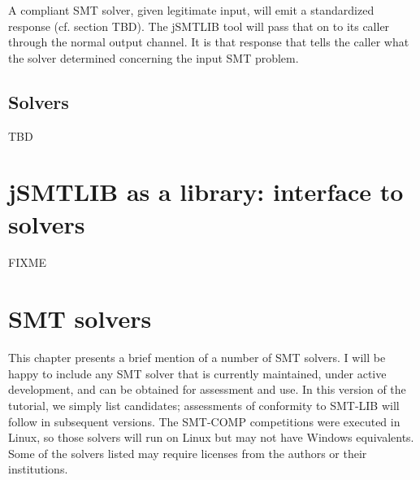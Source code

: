 \documentclass[12pt,oneside]{report}
\begin{document}
A compliant SMT solver, given legitimate input, will emit a standardized response (cf. section TBD). The jSMTLIB tool will pass that on to its caller through the normal output channel.  It is that response that tells the caller what the solver determined concerning the input SMT problem.

\section{Solvers}

TBD

\chapter{jSMTLIB as a library: interface to solvers}

FIXME

\chapter{SMT solvers}
\label{Solvers}

This chapter presents a brief mention of a number of SMT solvers. I will be happy to include any SMT solver that is currently maintained, under active development, and
can be obtained for assessment and use.  In this version of the tutorial, we simply list candidates; assessments of conformity to SMT-LIB will follow in subsequent versions. The SMT-COMP competitions were executed in Linux, so those solvers will run on Linux but may not have Windows equivalents. Some of the solvers listed may require licenses from the authors or their institutions.
\end{document}
